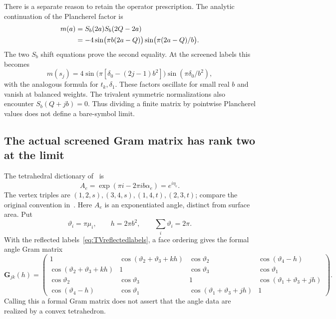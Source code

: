 There is a separate reason to retain the operator prescription.
The analytic continuation of the Plancherel factor is
\begin{align}
 m(a)&=S_b(2a)S_b(2Q-2a)\notag\\
 &=-4\sin\bigl(\pi b(2a-Q)\bigr)
        \sin\bigl(\pi(2a-Q)/b\bigr).
 \label{eq:continuedPlancherel}
\end{align}
The two $S_b$ shift equations prove the second equality.
At the screened labels this becomes
\begin{equation}
 m(s_j)=
 4\sin\bigl(\pi[\delta_0-(2j-1)b^2]\bigr)
       \sin(\pi\delta_0/b^2),
 \label{eq:screenedPlancherel}
\end{equation}
with the analogous formula for $t_k,\delta_1$. These factors
oscillate for small real $b$ and vanish at balanced weights.
The trivalent symmetric normalizations also encounter
$S_b(Q+jb)=0$. Thus dividing a finite matrix by pointwise
Plancherel values does not define a bare-symbol limit.

\subsection{The actual screened Gram matrix has rank two at the limit}

The tetrahedral dictionary of~\cite[Section~3]{TeschnerVartanov}
is
\[
 A_e=\exp(\pi i-2\pi ib\alpha_e)=e^{i\eta_e}.
\]
The vertex triples are $(1,2,s),(3,4,s),(1,4,t),(2,3,t)$;
compare the original convention in~\cite{MurakamiYano}.
Here $A_e$ is an exponentiated angle, distinct from surface area.
Put
\[
 \vartheta_i=\pi\mu_i,\qquad h=2\pi b^2,\qquad
 \sum_i\vartheta_i=2\pi.
\]
With the reflected labels~\eqref{eq:TVreflectedlabels}, a
face ordering gives the formal angle Gram matrix
\begin{equation}
 \mathbf G_{jk}(h)=
 \begin{pmatrix}
 1&\cos(\vartheta_2+\vartheta_3+kh)&\cos\vartheta_2&
                                      \cos(\vartheta_4-h)\\
 \cos(\vartheta_2+\vartheta_3+kh)&1&\cos\vartheta_3&\cos\vartheta_1\\
 \cos\vartheta_2&\cos\vartheta_3&1&
                                      \cos(\vartheta_1+\vartheta_3+jh)\\
 \cos(\vartheta_4-h)&\cos\vartheta_1&
                    \cos(\vartheta_1+\vartheta_3+jh)&1
 \end{pmatrix}.
 \label{eq:screenedangleGram}
\end{equation}
Calling this a formal Gram matrix does not assert that the
angle data are realized by a convex tetrahedron.

